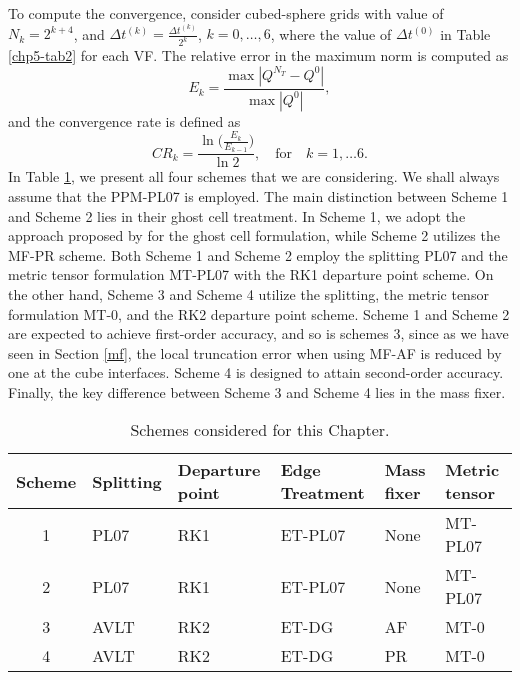 To compute the convergence, consider cubed-sphere grids with value of $N_k =  2^{k+4}$,
and $\Delta t^{(k)} = \frac{\Delta t^{(k)}}{2^k}$, $k=0, \ldots, 6$, where
the value of $\Delta t^{(0)}$ in Table \ref{chp5-tab2} for each VF.
The relative error in the maximum norm is computed as
\begin{equation}
	E_k = \frac{\max |Q^{N_T} - Q^0|}{\max {|Q^0|}},
\end{equation}
and the convergence rate is defined as
\begin{equation*}
	CR_k = \frac{\ln{\bigg(\frac{E_{k}}{E_{k-1}}}\bigg)}{\ln 2}, \quad \text{for} \quad k = 1, \ldots 6.
\end{equation*}
In Table \ref{chp5-tab3}, we present all four schemes that we are considering. 
We shall always assume that the PPM-PL07 is employed. 
The main distinction between Scheme 1 and Scheme 2 lies in their ghost cell treatment.
In Scheme 1, we adopt the approach proposed by \citet{putman:2007} for the ghost cell formulation,
while Scheme 2 utilizes the MF-PR scheme.
Both Scheme 1 and Scheme 2 employ the splitting PL07 and the metric tensor formulation MT-PL07 
with the RK1 departure point scheme. On the other hand, Scheme 3 and Scheme 4 utilize the splitting,
the metric tensor formulation MT-0, and the RK2 departure point scheme.
Scheme 1 and Scheme 2 are expected to achieve first-order accuracy, and so is schemes 3, since as we have seen in Section \ref{mf},
the local truncation error when using MF-AF is reduced by one at the cube interfaces.
Scheme 4 is designed
to attain second-order accuracy. Finally, the key difference between Scheme 3 and Scheme 4 lies in the mass fixer.
\begin{table}[!ht]
	\begin{tabular}{|c|l|l|l|l|l|}
		\hline
		Scheme & Splitting & Departure point & Edge Treatment & Mass fixer & Metric tensor\\ \hline
		1   & PL07 & RK1 & ET-PL07 & None & MT-PL07\\ \hline
		2   & PL07 & RK1 & ET-PL07 & None & MT-PL07\\ \hline
		3   & AVLT & RK2 & ET-DG & AF & MT-0\\ \hline
		4   & AVLT & RK2 & ET-DG & PR & MT-0\\ \hline
	\end{tabular}
	\caption{Schemes considered for this Chapter.}
	\label{chp5-tab3} 
\end{table}

